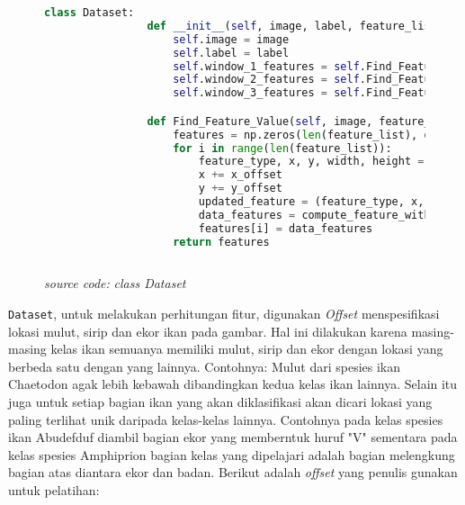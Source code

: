 	\begin{figure}[H]
		\begin{lstlisting}[language=Python, basicstyle=\tiny]
			class Dataset:
				def __init__(self, image, label, feature_list):
					self.image = image
					self.label = label
					self.window_1_features = self.Find_Feature_Value(image, feature_list, self.class_Window_offset_1[label][0], self.class_Window_offset_1[label][1])
					self.window_2_features = self.Find_Feature_Value(image, feature_list, self.class_Window_offset_2[label][0], self.class_Window_offset_2[label][1])
					self.window_3_features = self.Find_Feature_Value(image, feature_list, self.class_Window_offset_3[label][0], self.class_Window_offset_3[label][1])

				def Find_Feature_Value(self, image, feature_list, x_offset, y_offset):
					features = np.zeros(len(feature_list), dtype=object)
					for i in range(len(feature_list)):
						feature_type, x, y, width, height = feature_list[i]
						x += x_offset
						y += y_offset
						updated_feature = (feature_type, x, y, width, height)
						data_features = compute_feature_with_matrix(image, 0, updated_feature)
						features[i] = data_features
					return features
				
		\end{lstlisting}
		\caption{\emph{source code:} \textit{class Dataset}}
		\label{code:Dataset class}
	\end{figure}

	\texttt{Dataset}, untuk melakukan perhitungan fitur, digunakan \textit{Offset} 
	menspesifikasi lokasi mulut, sirip dan ekor ikan pada gambar. Hal ini dilakukan 
	karena masing-masing kelas ikan semuanya memiliki 
	mulut, sirip dan ekor dengan lokasi yang berbeda satu dengan yang lainnya. Contohnya: Mulut dari spesies ikan Chaetodon 
	agak lebih kebawah dibandingkan kedua kelas ikan lainnya. Selain itu juga untuk setiap bagian 
	ikan yang akan diklasifikasi akan dicari lokasi yang paling terlihat unik daripada kelas-kelas lainnya. Contohnya 
	pada kelas spesies ikan Abudefduf diambil bagian ekor yang memberntuk huruf "V" 
	sementara pada kelas spesies Amphiprion bagian kelas yang dipelajari adalah 
	bagian melengkung bagian atas diantara ekor dan badan. Berikut adalah 
	\textit{offset} yang penulis gunakan untuk pelatihan:

